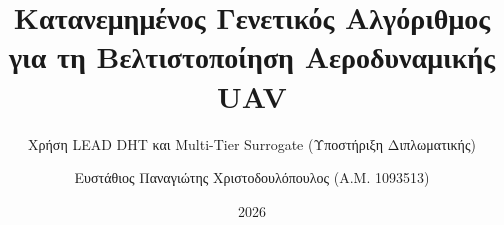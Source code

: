 \title[Distributed GA \& LEAD DHT for UAVs]{Κατανεμημένος Γενετικός Αλγόριθμος για τη Βελτιστοποίηση Αεροδυναμικής UAV}
\subtitle{Χρήση LEAD DHT και Multi-Tier Surrogate (Υποστήριξη Διπλωματικής)}
\author[Ε. Π. Χριστοδουλόπουλος]{Ευστάθιος Παναγιώτης Χριστοδουλόπουλος (Α.Μ. 1093513)}
\date{2026}
